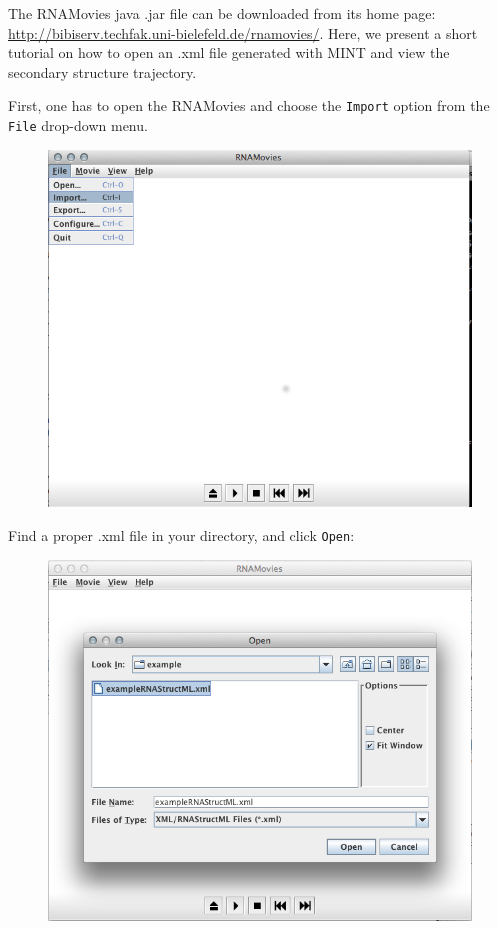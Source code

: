 \documentclass[12pt]{article}
\begin{document}
The RNAMovies \cite{Evers1999}  java .jar file can be downloaded from its home page: \url{http://bibiserv.techfak.uni-bielefeld.de/rnamovies/}. Here, we present a short tutorial on how to open an .xml file generated with MINT and view the secondary structure trajectory.

First, one has to open the RNAMovies and choose the \texttt{Import} option from the \texttt{File} drop-down menu. 
\begin{figure}[h!]
\centering
\includegraphics[scale=0.4]{./pictures/RNAmovies_1.png}
\end{figure}
\newpage
Find a proper .xml file in your directory, and click \texttt{Open}:
\begin{figure}[h!]
\centering
\includegraphics[scale=0.4]{./pictures/RNAmovies_2.png}
\end{figure}
\end{document}
